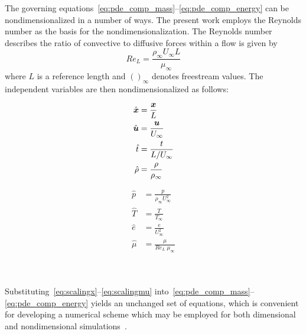 The governing equations~\eqref{eq:pde_comp_mass}--\eqref{eq:pde_comp_energy} can be nondimensionalized in a number of ways.  The present work employs the Reynolds number as the basis for the nondimensionalization. The Reynolds number describes the ratio of convective to diffusive forces within a flow is given by
\begin{equation}
  \label{eq:reynolds}
  Re_L = \frac{\rho_\infty U_\infty L}{\mu_\infty}
\end{equation}
where $L$ is a reference length and $()_\infty$ denotes freestream values. The independent variables are then nondimensionalized as follows:
\\ %
\begin{minipage}[t]{.44\columnwidth}
  \begin{align}
    \label{eq:scalingx}
    \hat{{\boldsymbol{x}}} &= \frac{{\boldsymbol{x}}}{L} \\
    \label{eq:scalingu}
    \hat{{\boldsymbol{u}}} &= \frac{{\boldsymbol{u}}}{U_\infty} \\
    \label{eq:scalingt}
    \hat{t} &= \frac{t}{L/U_\infty} \\
    \label{eq:scalingrho}
    \hat{\rho} &= \frac{\rho}{\rho_\infty}
  \end{align}
\end{minipage}
\hspace{.1\columnwidth}
\begin{minipage}[t]{.44\columnwidth}
  \begin{align}
    \label{eq:scalingP}
    \hat{p} &= \frac{p}{\rho_\infty U_\infty^2}  \\
    \label{eq:scalingT}
    \hat{T} &= \frac{T}{T_\infty} \\
    \label{eq:scalinge}
    \hat{e} &= \frac{e}{U_\infty^2} \\
    \label{eq:scalingmu}
    \hat{\mu} &= \frac{\mu}{Re_L\;\mu_\infty}
  \end{align}
\end{minipage}
\\ \\
Substituting~\eqref{eq:scalingx}--\eqref{eq:scalingmu} into~\eqref{eq:pde_comp_mass}--\eqref{eq:pde_comp_energy} yields an unchanged set of equations, which is convenient for developing a numerical scheme which may be employed for both dimensional and nondimensional simulations~\cite{cfmht}.

